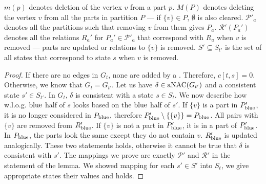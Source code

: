 \( m(p) \) denotes deletion of  the vertex \( v \) from a part \( p \).
\( M(P) \) denotes deleting the vertex \( v \) from all the parts in partition \( P \)
--- if \( \{v\} \in P \), \( \emptyset \) is also cleared.
\( \mathcal{P'}_a \) denotes all the partitions such that removing \( v \) from them gives \( P_a \).
\( \mathcal{R'}(P_a') \) denotes all the relations \( R_a' \)
for \( P_a' \in \mathcal{P'}_a \) that correspond with \( R_a \) when \( v \) is removed
--- parts are updated or relations to \( \{v\} \) is removed.
\( S' \subseteq S_{t'} \) is the set of all states that
correspond to state \( s \) when \( v \) is removed.
%
\begin{proof}
	If there are no edges in \( G_t \), none are added by a \ForgetVertexNode{}.
	Therefore, \( c[t, s] = 0 \).
	Otherwise, we know that \( G_t = G_{t'} \).
	Let us have \( \delta \in \operatorname{aNAC}(G_{t'}) \)
	and a consistent state \( s' \in S_{t'} \).
	In \( G_t \), \( \delta \) is consistent with a state \( s \in S_t \).
	We now describe how w.l.o.g. \( \text{blue} \) half of \( s \) looks
	based on the \( \text{blue} \) half of \( s' \).
	If \( \{v\} \) is a part in \( P_{\text{blue}}' \),
	it is no longer considered in \( P_{\text{blue}} \),
	therefore \( P_{\text{blue}}' \setminus \{\{v\}\} = P_{\text{blue}} \).
	All pairs with \( \{v\} \) are removed from \( R_{\text{blue}}' \).
	If \( \{v\} \) is not a part in \( P_{\text{blue}}' \),
	it is in a part of \( P_{\text{blue}}' \).
	In \( P_{\text{blue}} \), the parts look the same except they do not
	contain \( v \). \( R_{\text{blue}}' \) is updated analogically.
	These two statements holds, otherwise it cannot be true
	that \( \delta \) is consistent with \( s' \).
	The mappings we prove are exactly \( \mathcal{P'} \) and \( \mathcal{R'} \)
	in the statement of the lemma.
	We showed mapping for each \( s' \in S' \) into \( S_t \),
	we give appropriate states their values and  holds.
\end{proof}
%

\subsubsection*{\IntroduceEdgeNode{}}

